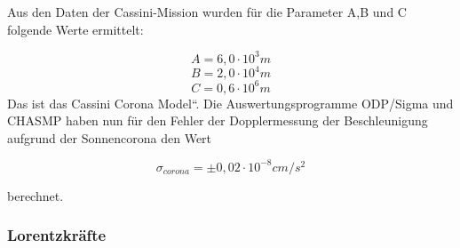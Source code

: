 Aus den Daten der Cassini-Mission wurden f\"ur die Parameter A,B und C
folgende Werte ermittelt:

\begin{equation*}
A=6,0\cdot 10^{3}m
\end{equation*}
\begin{equation*}
B=2,0\cdot 10^{4}m
\end{equation*}
\begin{equation*}
C=0,6\cdot 10^{6}m
\end{equation*}
Das ist das {\quotedblbase}Cassini Corona Model``. Die
Auswertungsprogramme ODP/Sigma und CHASMP haben nun f\"ur den Fehler
der Dopplermessung der Beschleunigung aufgrund der Sonnencorona den
Wert

\begin{equation}
\sigma _{\mathit{corona}}=\pm 0,02\cdot
10^{-8}\mathit{cm}/s^{2}
\end{equation} 

berechnet\cite{Anderson2002}.


\bigskip

\subsubsection{Lorentzkr\"afte}

